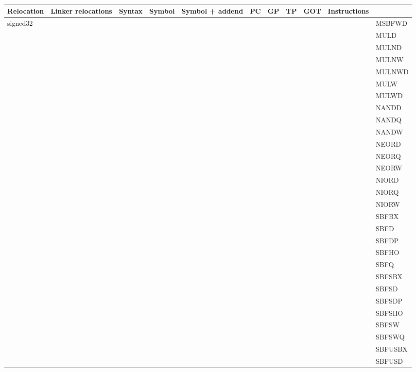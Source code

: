 {\tiny
\begin{tabular}{|l|l|l|l|l|l|l|l|l|l|l|} \hline
\textsf{Relocation} & \textsf{Linker relocations} & \textsf{Syntax} & \textsf{Symbol} & \textsf{Symbol + addend} & \textsf{PC} & \textsf{GP} & \textsf{TP} & \textsf{GOT} & \textsf{Instructions} \\
\hline
\textsf{signed32} & & & & & & & & & & \textsf{MSBFWD} \\
 & & & & & & & & & & \textsf{MULD} \\
 & & & & & & & & & & \textsf{MULND} \\
 & & & & & & & & & & \textsf{MULNW} \\
 & & & & & & & & & & \textsf{MULNWD} \\
 & & & & & & & & & & \textsf{MULW} \\
 & & & & & & & & & & \textsf{MULWD} \\
 & & & & & & & & & & \textsf{NANDD} \\
 & & & & & & & & & & \textsf{NANDQ} \\
 & & & & & & & & & & \textsf{NANDW} \\
 & & & & & & & & & & \textsf{NEORD} \\
 & & & & & & & & & & \textsf{NEORQ} \\
 & & & & & & & & & & \textsf{NEORW} \\
 & & & & & & & & & & \textsf{NIORD} \\
 & & & & & & & & & & \textsf{NIORQ} \\
 & & & & & & & & & & \textsf{NIORW} \\
 & & & & & & & & & & \textsf{SBFBX} \\
 & & & & & & & & & & \textsf{SBFD} \\
 & & & & & & & & & & \textsf{SBFDP} \\
 & & & & & & & & & & \textsf{SBFHO} \\
 & & & & & & & & & & \textsf{SBFQ} \\
 & & & & & & & & & & \textsf{SBFSBX} \\
 & & & & & & & & & & \textsf{SBFSD} \\
 & & & & & & & & & & \textsf{SBFSDP} \\
 & & & & & & & & & & \textsf{SBFSHO} \\
 & & & & & & & & & & \textsf{SBFSW} \\
 & & & & & & & & & & \textsf{SBFSWQ} \\
 & & & & & & & & & & \textsf{SBFUSBX} \\
 & & & & & & & & & & \textsf{SBFUSD} \\

\end{tabular}}
